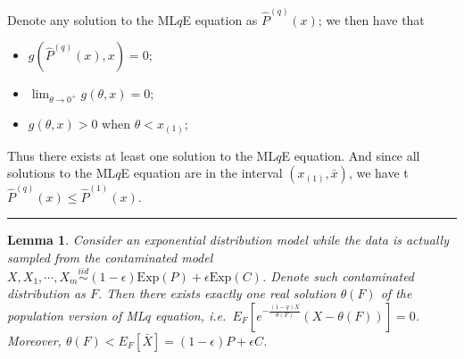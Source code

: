 \documentclass[a4paper]{article}
\newenvironment{proof}{{\bf Proof:  }}{\hfill\rule{2mm}{2mm}}
\newtheorem{lemma}[fact]{Lemma}
\renewcommand{\hat}{\widehat}
\begin{document}
\begin{proof}
Denote any solution to the ML$q$E equation as $\hat{P}^{(q)}(x)$; we then have that
\begin{itemize}
\item $g(\hat{P}^{(q)}(x), x) = 0$;
\item $\lim_{\theta \rightarrow 0^+}g(\theta, x) = 0$;
\item $g(\theta, x) > 0$ when $\theta < x_{(1)}$;
\end{itemize}

Thus there exists at least one solution to the ML$q$E equation. And since all solutions to the ML$q$E equation are in the interval $(x_{(1)},\bar{x})$, we have t$\hat{P}^{(q)}(x) \leq \hat{P}^{(1)}(x)$. 
\end{proof}

\begin{lemma}
\label{lemma:PopulationLqExist}
Consider an exponential distribution model while the data is actually sampled from the contaminated model $X, X_1, \cdots, X_m \stackrel{iid}{\sim} (1-\epsilon) \mathrm{Exp}(P) + \epsilon \mathrm{Exp}(C)$. Denote such contaminated distribution as $F$.
Then there exists exactly one real solution $\theta(F)$ of the population version of ML$q$ equation,
i.e.\ $E_F[e^{-\frac{(1-q)X}{\theta(F)}}(X - \theta(F))] = 0$. Moreover, $\theta(F) < E_F[\bar{X}] = (1-\epsilon) P + \epsilon C$.
\end{lemma}
\end{document}
